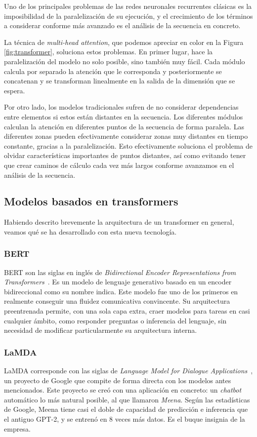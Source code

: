 Uno de los principales problemas de las redes neuronales recurrentes clásicas es la imposibilidad de la paralelización de su ejecución, y el crecimiento de los términos a considerar conforme más avanzado es el análisis de la secuencia en concreto.

La técnica de \textit{multi-head attention}, que podemos apreciar en color en la Figura \ref{fig:transformer}, soluciona estos problemas. En primer lugar, hace la paralelización del modelo no solo posible, sino también muy fácil. Cada módulo calcula por separado la atención que le corresponda y posteriormente se concatenan y se transforman linealmente en la salida de la dimensión que se espera. 

Por otro lado, los modelos tradicionales sufren de no considerar dependencias entre elementos si estos están distantes en la secuencia. Los diferentes módulos calculan la atención en diferentes puntos de la secuencia de forma paralela. Las diferentes zonas pueden efectivamente considerar zonas muy distantes en tiempo constante, gracias a la paralelización. Esto efectivamente soluciona el problema de olvidar características importantes de puntos distantes, así como evitando tener que crear caminos de cálculo cada vez más largos conforme avanzamos en el análisis de la secuencia.


\subsection{Modelos basados en transformers}
Habiendo descrito brevemente la arquitectura de un transformer en general, veamos qué se ha desarrollado con esta nueva tecnología.

\subsubsection{BERT}
BERT son las siglas en inglés de \textit{Bidirectional Encoder Representations from Transformers}~\cite{bertDevlin2019}. Es un modelo de lenguaje generativo basado en un encoder bidireccional como su nombre indica. Este modelo fue uno de los primeros en realmente conseguir una fluidez comunicativa convincente. Su arquitectura preentrenada permite, con una sola capa extra, craer modelos para tareas en casi cualquier ámbito, como responder preguntas o inferencia del lenguaje, sin necesidad de modificar particularmente su arquitectura interna.


\subsubsection{LaMDA}
LaMDA corresponde con las siglas de \textit{Language Model for Dialogue Applications}~\cite{LaMDAGoogle2020}, un proyecto de Google que compite de forma directa con los modelos antes mencionados. Este proyecto se creó con una aplicación en concreto: un \textit{chatbot} automático lo más natural posible, al que llamaron \textit{Meena}. Según las estadísticas de Google, Meena tiene casi el doble de capacidad de predicción e inferencia que el antiguo GPT-2, y se entrenó en 8 veces más datos. Es el buque insignia de la empresa.

